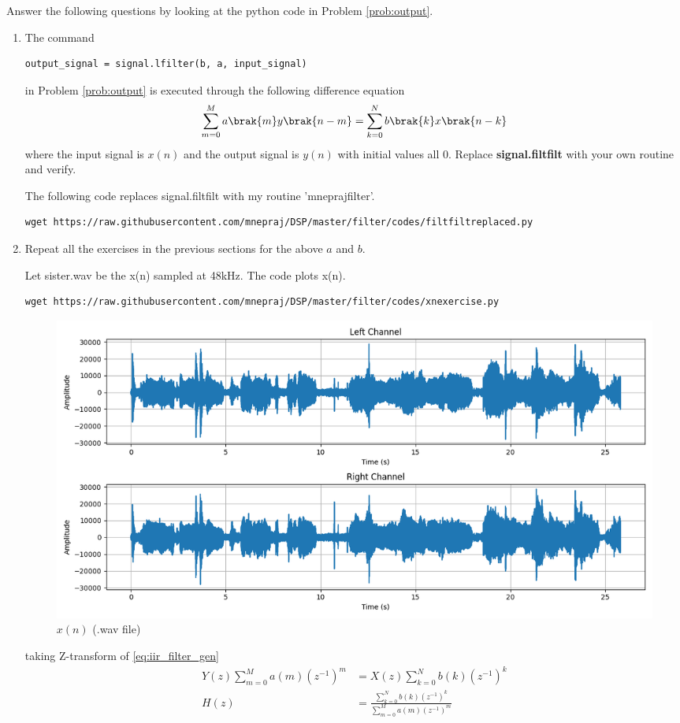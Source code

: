 \documentclass[journal,12pt,twocolumn]{IEEEtran}
\renewcommand\thesection{\arabic{section}}
\begin{document}
Answer the following questions by looking at the python code in Problem \ref{prob:output}.
\begin{enumerate}[label=\thesection.\arabic*]
	\item
	      The command
	      \begin{lstlisting}
output_signal = signal.lfilter(b, a, input_signal)
\end{lstlisting}
	      in Problem \ref{prob:output} is executed through the following difference equation
	      \begin{equation}
		      \label{eq:iir_filter_gen}
		      \sum _{m=0}^{M}a\brak{m}y\brak{n-m}=\sum _{k=0}^{N}b\brak{k}x\brak{n-k}
	      \end{equation}
	      where the input signal is $x(n)$ and the output signal is $y(n)$ with initial values all 0. Replace
	      \textbf{signal.filtfilt} with your own routine and verify.

	      \solution
	      The following code replaces signal.filtfilt with my routine 'mneprajfilter'.
	      \begin{lstlisting}
wget https://raw.githubusercontent.com/mnepraj/DSP/master/filter/codes/filtfiltreplaced.py
\end{lstlisting}

	\item Repeat all the exercises in the previous sections for the above $a$ and $b$.

	      \solution
	      Let sister.wav be the x(n) sampled at 48kHz.
	      The code plots x(n).
	      \begin{lstlisting}
wget https://raw.githubusercontent.com/mnepraj/DSP/master/filter/codes/xnexercise.py
\end{lstlisting}
	      \begin{figure}[h]
		      \centering
		      \includegraphics[width=\columnwidth]{figs/xnexercise.png}
		      \caption{$x(n)$ (.wav file)}
		      \label{fig:xn_exercise}
	      \end{figure}
	      taking Z-transform of \eqref{eq:iir_filter_gen}
	      \begin{align}
		      Y(z) \sum_{m=0}^{M} a(m)(z^{-1})^m & = X(z) \sum_{k=0}^{N} b(k)(z^{-1})^k                                  \\
		      H(z)                               & = \frac{\sum_{k=0}^{N} b(k)(z^{-1})^k}{\sum_{m=0}^{M} a(m)(z^{-1})^m}
	      \end{align}


\end{enumerate}
\end{document}

